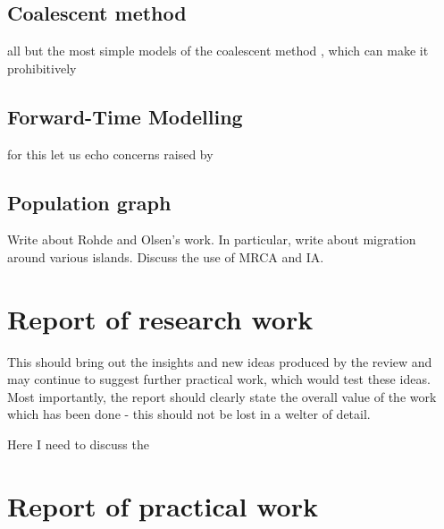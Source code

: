 \documentclass{l4proj}
\newif\ifdebug
\begin{document}
\section{Coalescent method}

 all but the most simple models of the coalescent method , which can make it prohibitively

\section{Forward-Time Modelling}

for this let us echo concerns raised by \cite{peng09}

\section{Population graph}

Write about Rohde and Olsen's work. In particular, write about migration around various islands. Discuss the use of MRCA and IA.

\chapter{Report of research work}\label{research}
This should bring out the insights and new ideas produced by the review and may continue to suggest further practical work, which would test these ideas. Most importantly, the report should clearly state the overall value of the work which has been done - this should not be lost in a welter of detail.

Here I need to discuss the 

\chapter{Report of practical work}\label{practical}
\ifdebug
This section should summarize the practical work done and its results, concentrating on any unusual or original features. Enough detail should be included to assure the reader that the work has been professionally and competently done, and that the results are trustworthy. Any design features, algorithms and data structures of special interest should be described. Documentation to full software engineering standards is not required.

glossary locus, loci, polyploid, chromosome, DAG, extension modules

\fi
\end{document}

